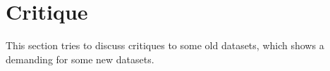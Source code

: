 \section{Critique}

This section tries to discuss critiques to some old datasets, which shows a demanding for some new datasets.